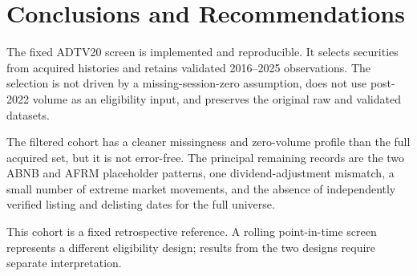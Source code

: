 \section{Conclusions and Recommendations}

The fixed ADTV20 screen is implemented and reproducible. It selects
\SelectedSecurities{} securities from \AcquiredSecurities{} acquired
histories and retains \SelectedObservations{} validated 2016--2025
observations. The selection is not driven by a missing-session-zero
assumption, does not use post-2022 volume as an eligibility input, and
preserves the original raw and validated datasets.

The filtered cohort has a cleaner missingness and zero-volume profile than the
full acquired set, but it is not error-free. The principal remaining records
are the two ABNB and AFRM placeholder patterns, one dividend-adjustment
mismatch, a small number of extreme market movements, and the absence of
independently verified listing and delisting dates for the full universe.

This cohort is a fixed retrospective reference. A rolling point-in-time
screen represents a different eligibility design; results from the two
designs require separate interpretation.
